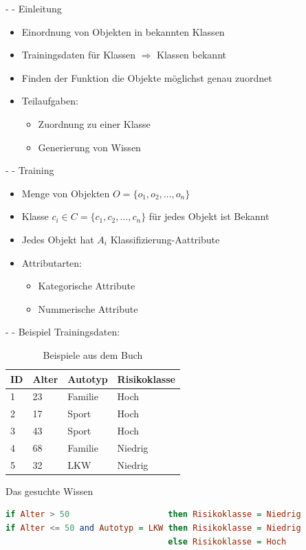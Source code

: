 \documentclass[fleqn,11pt,aspectratio=43]{beamer}
\begin{document}
\begin{frame}{\insertsectionhead - \insertsubsectionhead - Einleitung\cite{ester2000knowledge}}
\begin{itemize}
\item Einordnung von Objekten in bekannten Klassen
\item Trainingsdaten für Klassen $\Rightarrow$ Klassen bekannt
\item Finden der Funktion die Objekte möglichst genau zuordnet
\item Teilaufgaben:
\begin{itemize}
\item Zuordnung zu einer Klasse
\item Generierung von Wissen 
\end{itemize}
\end{itemize}
\end{frame}

\begin{frame}{\insertsectionhead - \insertsubsectionhead - Training\cite{ester2000knowledge}}
\begin{itemize}
\item Menge von Objekten $O = \{o_1, o_2, \ldots, o_n\}$
\item Klasse $c_i \in C = \{c_1, c_2, \ldots, c_n\}$ für jedes Objekt ist Bekannt
\item Jedes Objekt hat $A_i$ Klassifizierung-Aattribute
\item Attributarten:
\begin{itemize}
\item Kategorische Attribute
\item Nummerische Attribute
\end{itemize}
\end{itemize}
\end{frame}

\begin{frame}[fragile]{\insertsectionhead - \insertsubsectionhead - Beispiel\cite{ester2000knowledge}}
Trainingsdaten:
\begin{table}
\begin{tabular}{|p{2cm}|p{2cm}|p{2cm}|p{2cm}|}\hline
ID 	& Alter	& Autotyp	& Risikoklasse \\\hline \hline
1	& 23	& Familie	& Hoch\\
2	& 17	& Sport		& Hoch\\
3	& 43	& Sport		& Hoch\\
4	& 68	& Familie	& Niedrig\\
5	& 32	& LKW		& Niedrig \\\hline
\end{tabular}
\caption{Beispiele aus dem Buch\cite{ester2000knowledge}}
\end{table}
\pause
Das gesuchte Wissen
\begin{lstlisting}[language=Haskell]
if Alter > 50                    then Risikoklasse = Niedrig
if Alter <= 50 and Autotyp = LKW then Risikoklasse = Niedrig
                                 else Risikoklasse = Hoch
\end{lstlisting}
\end{frame}
\end{document}
